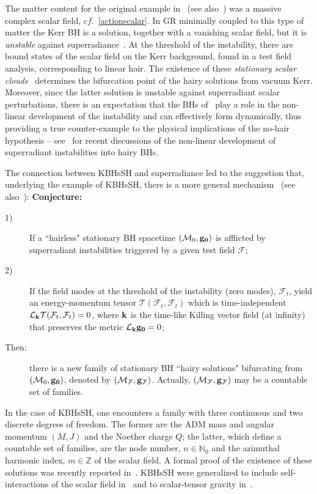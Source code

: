 \documentclass{article}
\numberwithin{equation}{section}
\begin{document}
The matter content for the original example in~\cite{Herdeiro:2014goa} (see also~\cite{Herdeiro:2015gia}) was a massive complex scalar field, $cf.$~\eqref{actionscalar}. In GR minimally coupled to this type of matter the Kerr BH is a solution, together with a vanishing scalar field, but it is \textit{unstable} against superradiance~\cite{Press:1972zz,Damour:1976kh,Brito:2015oca}. At the threshold of the instability, there are bound states of the scalar field on the Kerr background, found in a test field analysis, corresponding to linear hair. The existence of these \textit{stationary scalar clouds}~\cite{Hod:2012px,Hod:2013zza,Herdeiro:2014goa,Hod:2014baa,Benone:2014ssa,Hod:2014npa,Hod:2015ota} determines the bifurcation point of the hairy solutions from vacuum Kerr. Moreover, since the latter solution is unstable against superradiant scalar perturbations, there is an expectation that the BHs of~\cite{Herdeiro:2014goa} play a role in the non-linear development of the instability and can effectively form dynamically, thus providing a true counter-example to the physical implications of the no-hair hypothesis -- see~\cite{Sanchis-Gual:2015lje,Bosch:2016vcp} for recent discussions of the non-linear development of superradiant instabilities into hairy BHs. 

\bigskip

The connection between KBHsSH and superradiance led to the suggestion that, underlying the example of KBHsSH, there is a more general mechanism~\cite{Herdeiro:2014goa,Herdeiro:2014ima} (see also~\cite{Herdeiro:2015waa,Herdeiro:2015gia}): 
\newpage
{\bf Conjecture:}
\begin{description}
\item[1)] If a ``hairless" stationary BH spacetime $(\mathcal{M}_0,{\bf g_0})$ is afflicted by superradiant instabilities triggered by a given test field $\mathcal{F}$;
\item[2)] If the field modes at the threshold of the instability (zero modes), $\mathcal{F}_t$, yield an energy-momentum tensor $\mathcal{T}(\mathcal{F}_t,\mathcal{F}_t)$ which is time-independent $\mathcal{L}_{\bf k}\mathcal{T}(\mathcal{F}_t,\mathcal{F}_t)=0$, where ${\bf k}$ is the time-like Killing vector field (at infinity) that preserves the metric $\mathcal{L}_{\bf k}{\bf g_0}=0$;
\item[Then:] there is a new family of stationary BH ``hairy solutions" bifurcating from $(\mathcal{M}_0,{\bf g_0})$, denoted by $(\mathcal{M}_\mathcal{F},{\bf g_\mathcal{F}})$. Actually, $(\mathcal{M}_\mathcal{F},{\bf g_\mathcal{F}})$ may be a countable set of families.
\end{description}
In the case of KBHsSH, one encounters a family with three continuous and two discrete degrees of freedom. The former are the ADM mass and angular momentum $(M,J)$ and the Noether charge $Q$; the latter, which define a countable set of families, are the node number, $n\in \mathbb{N}_0$ and the azimuthal harmonic index, $m\in \mathbb{Z}$ of the scalar field. A formal proof of the existence of these solutions was recently reported in~\cite{Chodosh:2015oma}. KBHsSH were generalized to include self-interactions of the scalar field in~\cite{Herdeiro:2015tia} and to scalar-tensor gravity in~\cite{Kleihaus:2015iea}.
\end{document}
